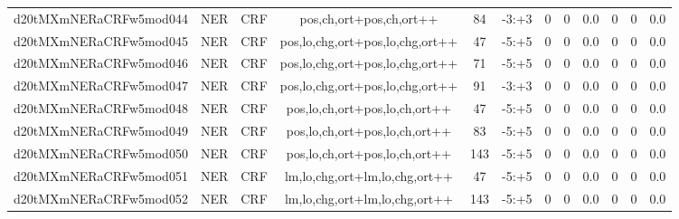 \documentclass[a4paper]{article}
\begin{document}
\begin{landscape}
\begin{center}
\begin{tabular}{ |c|c|c|c|c|c|c|c|c|c|c|c|}
 
 	
 	\small{ d20tMXmNERaCRFw5mod044 } & \small{ NER} & \small{  CRF }  & pos,ch,ort+pos,ch,ort++  &  84 &  \small{  -3:+3 }  &  0 & 0 & 0.0  &  0 & 0 & 0.0 \\
 	

 
 	
 	\small{ d20tMXmNERaCRFw5mod045 } & \small{ NER} & \small{  CRF }  & pos,lo,chg,ort+pos,lo,chg,ort++  &  47 &  \small{  -5:+5 }  &  0 & 0 & 0.0  &  0 & 0 & 0.0 \\
 	

 
 	
 	\small{ d20tMXmNERaCRFw5mod046 } & \small{ NER} & \small{  CRF }  & pos,lo,chg,ort+pos,lo,chg,ort++  &  71 &  \small{  -5:+5 }  &  0 & 0 & 0.0  &  0 & 0 & 0.0 \\
 	

 
 	
 	\small{ d20tMXmNERaCRFw5mod047 } & \small{ NER} & \small{  CRF }  & pos,lo,chg,ort+pos,lo,chg,ort++  &  91 &  \small{  -3:+3 }  &  0 & 0 & 0.0  &  0 & 0 & 0.0 \\
 	

 
 	
 	\small{ d20tMXmNERaCRFw5mod048 } & \small{ NER} & \small{  CRF }  & pos,lo,ch,ort+pos,lo,ch,ort++  &  47 &  \small{  -5:+5 }  &  0 & 0 & 0.0  &  0 & 0 & 0.0 \\
 	

 
 	
 	\small{ d20tMXmNERaCRFw5mod049 } & \small{ NER} & \small{  CRF }  & pos,lo,ch,ort+pos,lo,ch,ort++  &  83 &  \small{  -5:+5 }  &  0 & 0 & 0.0  &  0 & 0 & 0.0 \\
 	

 
 	
 	\small{ d20tMXmNERaCRFw5mod050 } & \small{ NER} & \small{  CRF }  & pos,lo,ch,ort+pos,lo,ch,ort++  &  143 &  \small{  -5:+5 }  &  0 & 0 & 0.0  &  0 & 0 & 0.0 \\
 	

 
 	
 	\small{ d20tMXmNERaCRFw5mod051 } & \small{ NER} & \small{  CRF }  & lm,lo,chg,ort+lm,lo,chg,ort++  &  47 &  \small{  -5:+5 }  &  0 & 0 & 0.0  &  0 & 0 & 0.0 \\
 	

 
 	
 	\small{ d20tMXmNERaCRFw5mod052 } & \small{ NER} & \small{  CRF }  & lm,lo,chg,ort+lm,lo,chg,ort++  &  143 &  \small{  -5:+5 }  &  0 & 0 & 0.0  &  0 & 0 & 0.0 \\
 	


\end{tabular}
\end{center}
\end{landscape}
\end{document}
